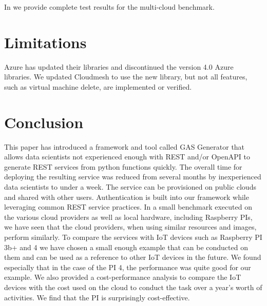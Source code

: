 In  we provide complete test results for the multi-cloud benchmark.

\section{Limitations}\label{limitations}

Azure has updated their libraries and discontinued the version 4.0 Azure
libraries. We updated Cloudmesh to use the new library, but not all
features, such as virtual machine delete, are implemented or verified.

\section{Conclusion}
\label{sec:conclusion}

This paper has introduced a framework and tool called GAS Generator that allows data scientists not experienced enough with REST and/or OpenAPI to generate REST services from python functions quickly. The overall time for deploying the resulting service was reduced from several months by inexperienced data scientists to under a week. The service can be provisioned on public clouds and shared with other users. Authentication is built into our framework while leveraging common REST service practices. 
In a small benchmark executed on the various cloud providers as well as local hardware, including Raspberry PIs, we have seen that the cloud providers, when using similar resources and images, perform similarly. To compare the services with IoT devices such as Raspberry PI 3b+ and 4 we have chosen a small enough example that can be conducted on them and can be used as a reference to other IoT devices in the future. We found especially that in the case of the PI 4, the performance was quite good for our example. We also provided a cost-performance analysis to compare the IoT devices with the cost used on the cloud to conduct the task over a year's worth of activities. We find that the PI is surprisingly cost-effective.


